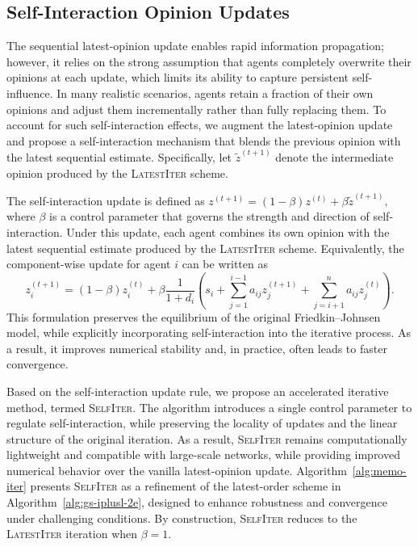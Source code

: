 \documentclass[sigconf,review, nonacm]{acmart}
\newcommand\zz{\boldsymbol{\mathit{z}}}
\begin{document}
\subsection{Self-Interaction Opinion Updates}

The sequential latest-opinion update enables rapid information propagation; however,
it relies on the strong assumption that agents completely overwrite their opinions at each update,
which limits its ability to capture persistent self-influence.
In many realistic scenarios, agents retain a fraction of their own opinions and adjust them incrementally rather than fully replacing them.
To account for such self-interaction effects, we augment the latest-opinion update and propose a self-interaction mechanism that blends the previous opinion with the latest sequential estimate.
Specifically, let $\tilde{\zz}^{(t+1)}$ denote the intermediate opinion produced by the \textsc{LatestIter} scheme.


The self-interaction update is defined as
$
\zz^{(t+1)} = (1-\beta)\zz^{(t)} + \beta \tilde{\zz}^{(t+1)},$
where $\beta$ is a control parameter that governs the strength and direction of self-interaction.
Under this update, each agent combines its own opinion with the latest sequential estimate
produced by the \textsc{LatestIter} scheme.
Equivalently, the component-wise update for agent $i$ can be written as
\[
z_{i}^{(t + 1)} = (1 - \beta) z_{i}^{(t)}
+ \beta \frac{1}{1 + d_{i}}
\left(
s_{i}
+ \sum_{j = 1}^{i - 1} a_{ij} z_{j}^{(t + 1)}
+ \sum_{j = i + 1}^{n} a_{ij} z_{j}^{(t)}
\right).
\]
This formulation preserves the equilibrium of the original Friedkin--Johnsen model,
while explicitly incorporating self-interaction into the iterative process.
As a result, it improves numerical stability and, in practice, often leads to faster convergence.

Based on the self-interaction update rule, we propose an accelerated iterative method, termed \textsc{SelfIter}.
The algorithm introduces a single control parameter to regulate self-interaction, while preserving the locality of updates and the linear structure of the original iteration.
As a result, \textsc{SelfIter} remains computationally lightweight and compatible with large-scale networks,
while providing improved numerical behavior over the vanilla latest-opinion update.
Algorithm~\ref{alg:memo-iter} presents \textsc{SelfIter} as a refinement of the latest-order scheme
in Algorithm~\ref{alg:gs-iplusl-2e}, designed to enhance robustness and convergence under challenging conditions.
By construction, \textsc{SelfIter} reduces to the \textsc{LatestIter} iteration when $\beta = 1$. 
\end{document}

